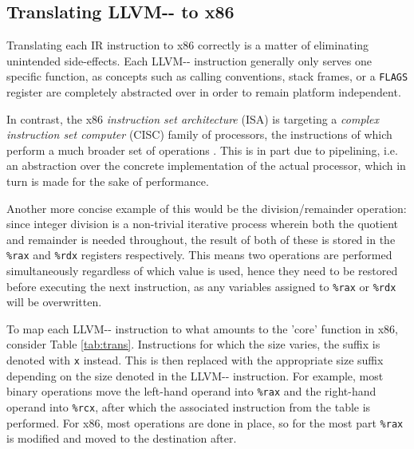 \documentclass{article}
\begin{document}
\subsection{Translating LLVM-{}- to x86}

Translating each IR instruction to x86 correctly is a matter of eliminating unintended side-effects. Each LLVM-{}- instruction generally only serves one specific function, %
as concepts such as calling conventions, stack frames, or a \lstinline!FLAGS! register are completely abstracted over in order to remain platform independent.

In contrast, the x86 \textit{instruction set architecture} (ISA) is targeting a  \textit{complex instruction set computer} (CISC) family of processors, the instructions of which perform a much broader set of operations \cite[p.~190]{tiger}. This is in part due to pipelining, i.e. an abstraction over the concrete implementation of the actual processor, which in turn is made for the sake of performance.

Another more concise example of this would be the division/remainder operation: since integer division is a non-trivial iterative process wherein both the quotient and remainder is needed throughout, the result of both of these is stored in the \texttt{\%rax} and \texttt{\%rdx} registers respectively. This means two operations are performed simultaneously regardless of which value is used, hence they need to be restored before executing the next instruction, as any variables assigned to \lstinline!%rax! or \lstinline!%rdx! will be overwritten.

To map each LLVM-{}- instruction to what amounts to the 'core' function in x86, consider Table \ref{tab:trans}. Instructions for which the size varies, the suffix is denoted with \texttt{x} instead. This is then replaced with the appropriate size suffix depending on the size denoted in the LLVM-{}- instruction. For example, most binary operations move the left-hand operand into \texttt{\%rax} and the right-hand operand into  \texttt{\%rcx}, after which the associated instruction from the table is performed. For x86, most operations are done in place, so for the most part \texttt{\%rax} is modified and moved to the destination after.
\end{document}
